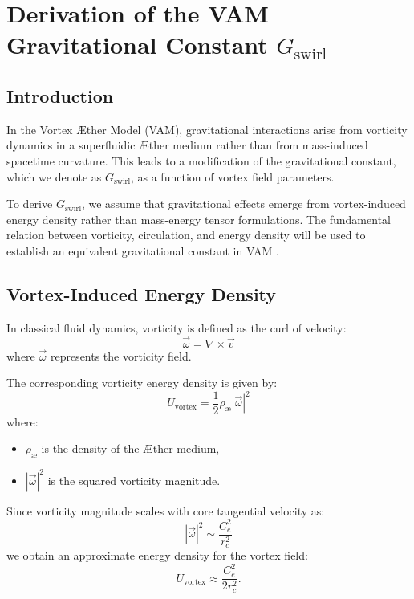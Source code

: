 \section*{Derivation of the VAM Gravitational Constant \(  G_\text{swirl} \)}

\subsection*{Introduction}
In the Vortex Æther Model (VAM), gravitational interactions arise from vorticity dynamics in a superfluidic Æther medium rather than from mass-induced spacetime curvature. This leads to a modification of the gravitational constant, which we denote as \(  G_\text{swirl} \), as a function of vortex field parameters.

To derive \(  G_\text{swirl} \), we assume that gravitational effects emerge from vortex-induced energy density rather than mass-energy tensor formulations. The fundamental relation between vorticity, circulation, and energy density will be used to establish an equivalent gravitational constant in VAM \cite{onsager_superfluid, barcelo_superfluid, moffatt_helicity}.

\subsection*{Vortex-Induced Energy Density}
In classical fluid dynamics, vorticity is defined as the curl of velocity:
\begin{equation*}
    \vec{\omega} = \nabla \times \vec{v}
\end{equation*}
where \( \vec{\omega} \) represents the vorticity field.

The corresponding vorticity energy density is given by:
\begin{equation*}
    U_\text{vortex} = \frac{1}{2} \rho_\text{\ae} |\vec{\omega}|^2
\end{equation*}
where:
\begin{itemize}
    \item \( \rho_\text{\ae} \) is the density of the Æther medium,
    \item \( |\vec{\omega}|^2 \) is the squared vorticity magnitude.
\end{itemize}

Since vorticity magnitude scales with core tangential velocity as:
\begin{equation*}
    |\vec{\omega}|^2 \sim \frac{C_e^2}{r_c^2}
\end{equation*}
we obtain an approximate energy density for the vortex field:
\begin{equation*}
    U_\text{vortex} \approx \frac{C_e^2}{2 r_c^2}.
\end{equation*}

